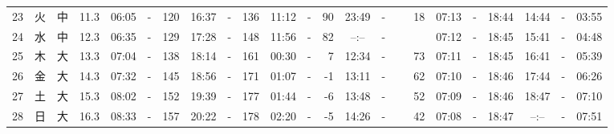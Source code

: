 \documentclass[12pt,a4j]{jsarticle}
\begin{document}
\begin{table}[htbp]
\begin{center}
{\begin{tabular}{|rc|cr|ccrccr|ccrccr|ccc|ccc|}
23 & 火 & 中 & 11.3 &  06:05 &-& 120 &  16:37 &-& 136 &  11:12 &-&  90 &  23:49 &-&  18 & 07:13 & -& 18:44 & 14:44 & -& 03:55 \\
24 & 水 & 中 & 12.3 &  06:35 &-& 129 &  17:28 &-& 148 &  11:56 &-&  82 &  --:-- &-&~~~~~ & 07:12 & -& 18:45 & 15:41 & -& 04:48 \\
25 & 木 & 大 & 13.3 &  07:04 &-& 138 &  18:14 &-& 161 &  00:30 &-&   7 &  12:34 &-&  73 & 07:11 & -& 18:45 & 16:41 & -& 05:39 \\
26 & 金 & 大 & 14.3 &  07:32 &-& 145 &  18:56 &-& 171 &  01:07 &-&  -1 &  13:11 &-&  62 & 07:10 & -& 18:46 & 17:44 & -& 06:26 \\
27 & 土 & 大 & 15.3 &  08:02 &-& 152 &  19:39 &-& 177 &  01:44 &-&  -6 &  13:48 &-&  52 & 07:09 & -& 18:46 & 18:47 & -& 07:10 \\
28 & 日 & 大 & 16.3 &  08:33 &-& 157 &  20:22 &-& 178 &  02:20 &-&  -5 &  14:26 &-&  42 & 07:08 & -& 18:47 & --:-- & -& 07:51 \\
   \hline
   \end{tabular}}
   \end{center}
\end{table}
\newpage
\end{document}
